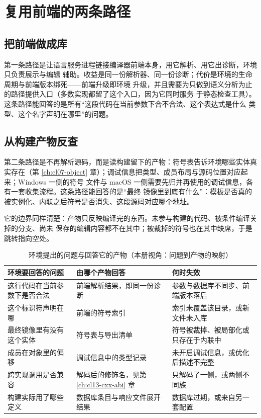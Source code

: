 \documentclass[12pt,a4paper,fontset=fandol]{ctexbook}
\newcommand{\Win}{\textsf{Windows}}
\newcommand{\Mac}{\textsf{macOS}}
\begin{document}
\section{复用前端的两条路径}\label{sec:cl14-two-roads}

\subsection{把前端做成库}\label{sec:cl14-frontend-lib}

第一条路径是让语言服务进程链接编译器前端本身，用它解析、用它出诊断，环境只负责展示与编辑
辅助。收益是同一份解析器、同一份诊断；代价是环境的生命周期与前端版本绑死——前端升级即环境
升级，并且需要为只做到语义分析为止的路径提供入口（多数实现都留了这个入口，因为它同时服务
于静态检查工具）。这条路径能回答的是所有“这段代码在当前参数下合不合法、这个表达式是什么
类型、这个名字声明在哪里”的问题。

\subsection{从构建产物反查}\label{sec:cl14-from-artifacts}

第二条路径是不再解析源码，而是读构建留下的产物：符号表告诉环境哪些实体真实存在（第
\ref{ch:cl07-object} 章）；调试信息把类型、成员布局与源码位置对应起来；\Win{} 一侧的符号
文件与 \Mac{} 一侧需要先归并再使用的调试信息，各有一套收集流程。这条路径能回答的是“最终
镜像里到底有什么”：模板是否真的被实例化、内联之后符号是否消失、这段源码对应哪个地址。

它的边界同样清楚：产物只反映编译完的东西。未参与构建的代码、被条件编译关掉的分支、尚未
保存的编辑内容都不在其中；被裁掉的符号也在其中缺席，于是跳转指向空处。

\begin{table}
\centering
\begin{tabular}{@{}>{\raggedright\arraybackslash}p{} >{\raggedright\arraybackslash}p{} >{\raggedright\arraybackslash}p{}@{}}
\toprule
环境要回答的问题 & 由哪个产物回答 & 何时失效 \\
\midrule
这行代码在当前参数下是否合法 & 前端解析结果，即同一份诊断 & 参数与数据库不同步、前端版本落后 \\
这个标识符声明在哪 & 前端的符号索引 & 索引未覆盖该目录，或新文件未入库 \\
最终镜像里有没有这个实体 & 符号表与导出清单 & 符号被裁掉、被局部化或只存在于内联中 \\
成员在对象里的偏移 & 调试信息中的类型记录 & 未开启调试信息，或优化后描述不完整 \\
跨实现调用是否兼容 & 解码后的修饰名，见第 \ref{ch:cl13-cxx-abi} 章 & 只解码了一侧，或两侧不同族 \\
构建实际用了哪些定义 & 数据库条目与响应文件展开结果 & 数据库过期，或来自另一套配置 \\
\bottomrule
\end{tabular}
\caption{环境提出的问题与回答它的产物（本册视角：问题到产物的映射）}
\label{tab:cl14-products}
\end{table}
\end{document}
